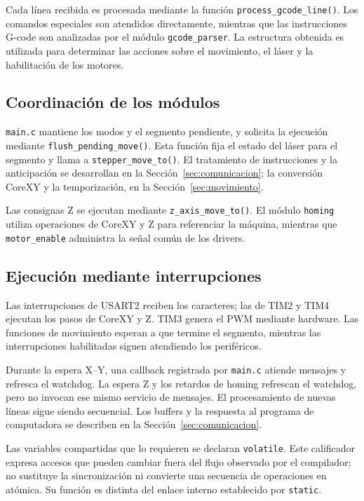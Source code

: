 \documentclass[blue,fullpaper]{ludusofficial}  %
\begin{document}
Cada línea recibida es procesada mediante
la función \texttt{process\_gcode\_line()}.
Los comandos especiales son atendidos
directamente, mientras que las instrucciones
G-code son analizadas por el módulo
\texttt{gcode\_parser}. La estructura obtenida
es utilizada para determinar las acciones
sobre el movimiento, el láser y la habilitación
de los motores.

\subsection{Coordinación de los módulos}
\texttt{main.c} mantiene los modos y el segmento pendiente, y solicita la ejecución mediante \texttt{flush\_pending\_move()}. Esta función fija el estado del láser para el segmento y llama a \texttt{stepper\_move\_to()}. El tratamiento de instrucciones y la anticipación se desarrollan en la Sección~\ref{sec:comunicacion}; la conversión CoreXY y la temporización, en la Sección~\ref{sec:movimiento}.

Las consignas Z se ejecutan mediante \texttt{z\_axis\_move\_to()}. El módulo \texttt{homing} utiliza operaciones de CoreXY y Z para referenciar la máquina, mientras que \texttt{motor\_enable} administra la señal común de los drivers.

\subsection{Ejecución mediante interrupciones}
Las interrupciones de USART2 reciben los caracteres; las de TIM2 y TIM4 ejecutan los pasos de CoreXY y Z. TIM3 genera el PWM mediante hardware. Las funciones de movimiento esperan a que termine el segmento, mientras las interrupciones habilitadas siguen atendiendo los periféricos.

Durante la espera X--Y, una callback registrada por \texttt{main.c} atiende mensajes y refresca el watchdog. La espera Z y los retardos de homing refrescan el watchdog, pero no invocan ese mismo servicio de mensajes. El procesamiento de nuevas líneas sigue siendo secuencial. Los buffers y la respuesta al programa de computadora se describen en la Sección~\ref{sec:comunicacion}.

Las variables compartidas que lo requieren se declaran \texttt{volatile}. Este calificador expresa accesos que pueden cambiar fuera del flujo observado por el compilador; no sustituye la sincronización ni convierte una secuencia de operaciones en atómica. Su función es distinta del enlace interno establecido por \texttt{static}.
\end{document}
